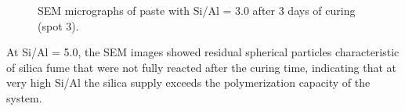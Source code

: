 \begin{figure}[H]
  \centering
  \caption{SEM micrographs of paste with Si/Al = 3.0 after 3 days of curing (spot 3).}
  \label{fig:si_al_3-0_spot3_sem}
\end{figure}

At Si/Al = 5.0, the SEM images showed residual spherical particles characteristic of silica fume that were not fully reacted after the curing time, indicating that at very high Si/Al the silica supply exceeds the polymerization capacity of the system.


